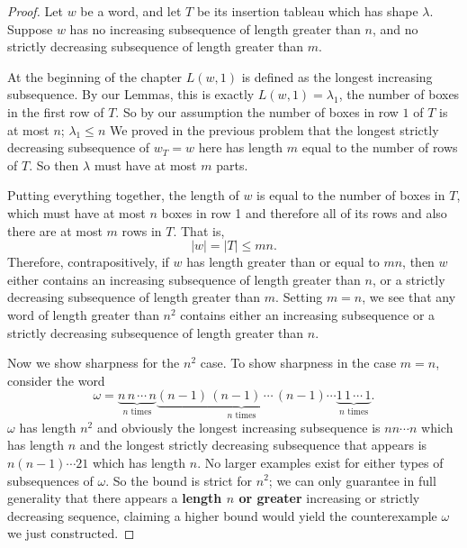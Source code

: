 \documentclass[addpoints,10pt]{exam}
\theoremstyle{plain}
\theoremstyle{definition}
\theoremstyle{plain}
\theoremstyle{plain}
\theoremstyle{definition}
\begin{document}
\begin{proof}
Let \(w\) be a word, and let \(T\) be its insertion tableau which has shape $\lambda$. Suppose \(w\) has no increasing subsequence of length greater than \(n\), and no strictly
decreasing subsequence of length greater than \(m\).

At the beginning of the chapter $L(w,1)$ is defined as the longest increasing subsequence. By our Lemmas, this is exactly $L(w,1)=\lambda_{1}$,
the number of boxes in the first row of \(T\). So by our assumption the number of boxes in row $1$ of $T$ is at most $n$; $\lambda_{1}\leq n$
We proved in the previous problem that the longest strictly decreasing subsequence of $w_{T}=w$ here has length $m$ equal to the
number of rows of \(T\). So then $\lambda$ must have at most $m$ parts.

Putting everything together, the length of $w$ is equal to the number of boxes in $T$, which must have at most $n$ boxes in row 1 and therefore all of its rows and also there are at most $m$ rows in $T$. That is,
\[
|w|=|T|\leq mn.
\]
Therefore, contrapositively, if $w$ has length greater than or equal to $mn$, then $w$ either contains an increasing subsequence of length greater than
\(n\), or a strictly decreasing subsequence of length greater than \(m\). Setting \(m=n\), we see that any word of length greater than \(n^2\) contains either an
increasing subsequence or a strictly decreasing subsequence of length greater
than \(n\).

Now we show sharpness for the $n^{2}$ case. To show sharpness in the case \(m=n\), consider the word
\[
\omega=
\underbrace{n\,n\,\cdots\,n}_{n\text{ times}}
\underbrace{(n-1)\,(n-1)\,\cdots\,(n-1)}_{n\text{ times}}
\cdots
\underbrace{1\,1\,\cdots\,1}_{n\text{ times}}.
\]
$\omega$ has length $n^{2}$ and obviously the longest increasing subsequence is $nn\cdots n$ which has length $n$ and the longest strictly decreasing subsequence that appears is $n(n-1)\cdots 21$ which has length $n$. No larger examples exist for either types of subsequences of $\omega$. So the bound is strict for $n^{2}$; we can only guarantee in full generality that there appears a \textbf{length $n$ or greater} increasing or strictly decreasing sequence, claiming a higher bound would yield the counterexample $\omega$ we just constructed.

\end{proof}

\newpage
\setcounter{thm}{2}
\renewcommand{\thethm}{3.\arabic{thm}}
\end{document}
